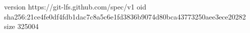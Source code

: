 version https://git-lfs.github.com/spec/v1
oid sha256:21ce4fe0df4fdb1dac7c8a5c6e1fd3836b9074d80bca43773250aee3ece20282
size 325004

